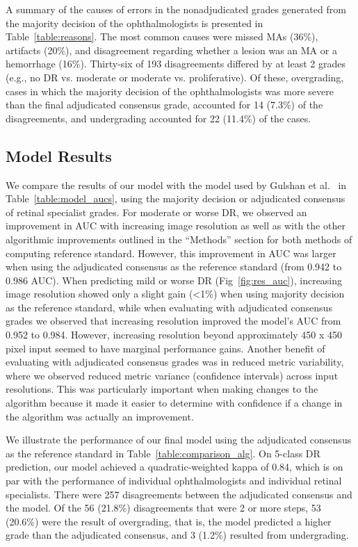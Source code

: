 \documentclass{llncs}
\begin{document}
A summary of the causes of errors in the nonadjudicated grades generated from the majority decision of the ophthalmologists is presented in Table~\ref{table:reasons}. The most common causes were missed MAs (36\%), artifacts (20\%), and disagreement regarding whether a lesion was an MA or a hemorrhage (16\%). Thirty-six of 193 disagreements differed by at least 2 grades (e.g., no DR vs.  moderate or moderate vs. proliferative). Of these, overgrading, cases in which the majority decision of the ophthalmologists was more severe than the final adjudicated consensus grade, accounted for 14 (7.3\%) of the disagreements, and undergrading accounted for 22 (11.4\%) of the cases.

\subsection{Model Results}
We compare the results of our model with the model used by Gulshan et al.~\cite{gulshan2016development} in Table~\ref{table:model_aucs}, using the majority decision or adjudicated consensus of retinal specialist grades. For moderate or worse DR, we observed an improvement in AUC with increasing image resolution as well as with the other algorithmic improvements outlined in the ``Methods'' section for both methods of computing reference standard. However, this improvement in AUC was larger when using the adjudicated consensus as the reference standard (from 0.942 to 0.986 AUC). When predicting mild or worse DR (Fig~\ref{fig:res_auc}), increasing image resolution showed only a slight gain (<1\%) when using majority decision as the reference standard, while when evaluating with adjudicated consensus grades we observed that increasing resolution improved the model's AUC from 0.952 to 0.984. However, increasing resolution beyond approximately 450 x 450 pixel input seemed to have marginal performance gains. Another benefit of evaluating with adjudicated consensus grades was in reduced metric variability, where we observed reduced metric variance (confidence intervals) across input resolutions. This was particularly important when making changes to the algorithm because it made it easier to determine with confidence if a change in the algorithm was actually an improvement.

We illustrate the performance of our final model using the adjudicated consensus as the reference standard in Table~\ref{table:comparison_alg}. On 5-class DR prediction, our model achieved a quadratic-weighted kappa of 0.84, which is on par with the performance of individual ophthalmologists and individual retinal specialists. There were 257 disagreements between the adjudicated consensus and the model. Of the 56 (21.8\%) disagreements that were 2 or more steps, 53 (20.6\%) were the result of overgrading, that is, the model predicted a higher grade than the adjudicated consensus, and 3 (1.2\%) resulted from undergrading.
\end{document}
